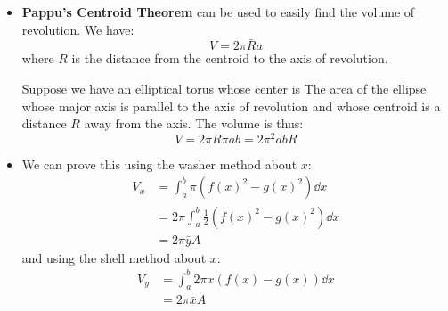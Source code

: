 \begin{itemize}
\begin{example}
    \end{example}
    \item \textbf{Pappu's Centroid Theorem} can be used to easily find the volume of revolution. We have:
    \begin{equation}
        V = 2\pi \bar{R} a
    \end{equation} 
    where $\bar{R}$ is the distance from the centroid to the axis of revolution.
    \begin{example}
        Suppose we have an elliptical torus whose center is The area of the ellipse whose major axis is parallel to the axis of revolution and whose centroid is a distance $R$ away from the axis. The volume is thus:
        \begin{equation}
            V = 2\pi R \pi ab = 2\pi^2 abR
        \end{equation}
    \end{example}
    \item We can prove this using the washer method about $x$:
    \begin{align}
        V_x &= \int_a^b \pi (f(x)^2-g(x)^2)\dd{x} \\ 
        &= 2\pi \int_a^b \frac{1}{2}(f(x)^2-g(x)^2)\dd{x} \\ 
        &= 2\pi \bar{y}A
    \end{align}
    and using the shell method about $x$:
    \begin{align}
        V_y &= \int_a^b 2\pi x(f(x)-g(x))\dd{x} \\ 
        &= 2\pi \bar{x} A
    \end{align}
\end{itemize}